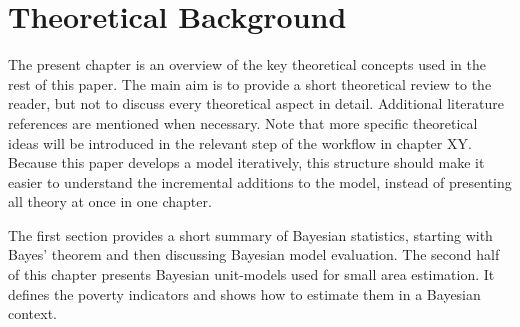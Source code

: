 \chapter{Theoretical Background}
The present chapter is an overview of the key theoretical concepts used in the rest of this paper.
The main aim is to provide a short theoretical review to the reader, but not to discuss every theoretical aspect in detail.
Additional literature references are mentioned when necessary.
Note that more specific theoretical ideas will be introduced in the relevant step of the workflow in chapter XY.
Because this paper develops a model iteratively, this structure should make it easier to understand the incremental additions to the model, instead of presenting all theory at once in one chapter.

The first section provides a short summary of Bayesian statistics, starting with Bayes' theorem and then discussing Bayesian model evaluation.
The second half of this chapter presents Bayesian unit-models used for small area estimation.
It defines the poverty indicators and shows how to estimate them in a Bayesian context.




